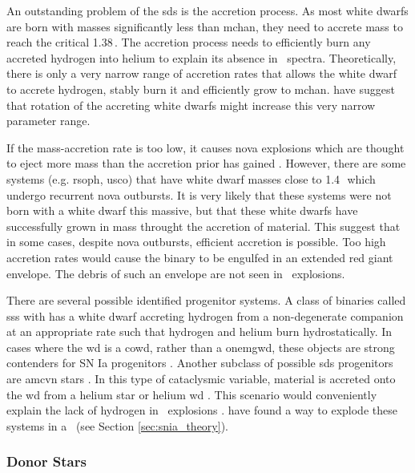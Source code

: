 An outstanding problem of the \gls{sds} is the accretion process.  As most white dwarfs are born with masses significantly less than \gls{mchan}, they need to accrete mass to reach the critical 1.38\,\msun. The accretion process needs to efficiently burn any accreted hydrogen into helium to  explain its absence in \sneia\ spectra. Theoretically, there is only a very narrow range of accretion rates that allows the white dwarf to accrete hydrogen, stably burn it and efficiently grow to \gls{mchan}. \cite{2004A&A...419..623Y} have suggest that rotation of the accreting white dwarfs might increase this very narrow parameter range.

 If the mass-accretion rate is too low, it causes nova explosions which are thought to eject more mass than the accretion prior has gained \citep{Nomoto:1982p451}. However, there are some systems (e.g. \gls{rsoph}, \gls{usco}) that have white dwarf masses close to 1.4\,\msun\ which undergo recurrent nova outbursts. It is very likely that these systems were not born with a white dwarf this massive, but that these white dwarfs have successfully grown in mass throught the accretion of material. This suggest that in some cases, despite nova outbursts, efficient accretion is possible. Too high accretion rates would cause the binary to be engulfed in an extended red giant envelope. The debris of such an envelope are not seen in \snia\ explosions. 
 
There are several possible identified progenitor systems. A class of binaries called \gls{sss} with has a white dwarf accreting hydrogen from a non-degenerate companion at an appropriate rate such that hydrogen and helium burn hydrostatically. In cases where the \gls{wd} is a \gls{cowd}, rather than a \gls{onemgwd}, these objects are strong contenders for SN Ia progenitors \citep[][and references therein]{2006astro.ph..6364D}. Another subclass of possible \gls{sds} progenitors are \gls{amcvn} stars \citep{2005ASPC..330...27N}. In this type of cataclysmic variable, material is accreted onto the \gls{wd} from a helium star or helium \gls{wd} \citep{1992A&A...262...97V}. This scenario would conveniently explain the lack of hydrogen in \snia\ explosions . \citet[][]{2010A&A...514A..53F} have found a way to explode these systems in a \snia\ (see Section \ref{sec:snia_theory}).


\subsubsection{Donor Stars}

